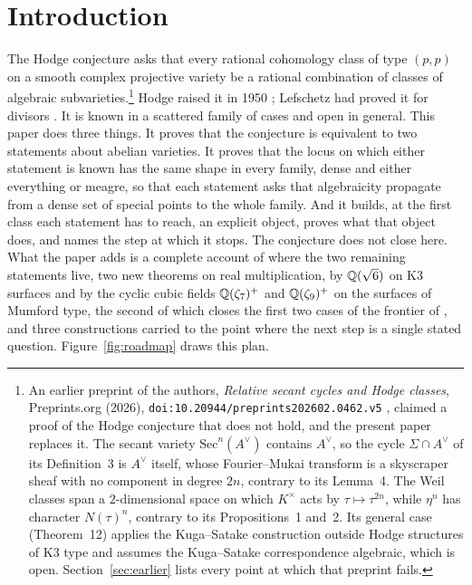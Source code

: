 \section{Introduction}\label{sec:intro}

The Hodge conjecture asks that every rational cohomology class of type $(p,p)$ on a smooth complex projective variety be a rational combination of classes of algebraic subvarieties.\footnote{An earlier preprint of the authors, \emph{Relative secant cycles and Hodge classes}, Preprints.org (2026), \nolinkurl{doi:10.20944/preprints202602.0462.v5} \cite{BB26}, claimed a proof of the Hodge conjecture that does not hold, and the present paper replaces it. The secant variety $\mathrm{Sec}^{n}(A^{\vee})$ contains $A^{\vee}$, so the cycle $\Sigma\cap A^{\vee}$ of its Definition~3 is $A^{\vee}$ itself, whose Fourier--Mukai transform is a skyscraper sheaf with no component in degree $2n$, contrary to its Lemma~4. The Weil classes span a $2$-dimensional space on which $K^{\times}$ acts by $\tau\mapsto\tau^{2n}$, while $\eta^{n}$ has character $N(\tau)^{n}$, contrary to its Propositions~1 and~2. Its general case (Theorem~12) applies the Kuga--Satake construction outside Hodge structures of K3 type and assumes the Kuga--Satake correspondence algebraic, which is open. Section~\ref{sec:earlier} lists every point at which that preprint fails.} Hodge raised it in 1950 \cite{Hod50}; Lefschetz had proved it for divisors \cite{Lef24}. It is known in a scattered family of cases and open in general. This paper does three things. It proves that the conjecture is equivalent to two statements about abelian varieties. It proves that the locus on which either statement is known has the same shape in every family, dense and either everything or meagre, so that each statement asks that algebraicity propagate from a dense set of special points to the whole family. And it builds, at the first class each statement has to reach, an explicit object, proves what that object does, and names the step at which it stops. The conjecture does not close here. What the paper adds is a complete account of where the two remaining statements live, two new theorems on real multiplication, by $\mathbb{Q}(\sqrt6)$ on K3 surfaces and by the cyclic cubic fields $\mathbb{Q}(\zeta_{7})^{+}$ and $\mathbb{Q}(\zeta_{9})^{+}$ on the surfaces of Mumford type, the second of which closes the first two cases of the frontier of \cite{BMB26}, and three constructions carried to the point where the next step is a single stated question. Figure~\ref{fig:roadmap} draws this plan.

